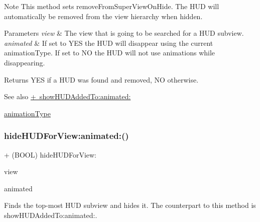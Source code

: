 \begin{DoxyNote}{Note}
This method sets {\ttfamily remove\+From\+Super\+View\+On\+Hide}. The H\+UD will automatically be removed from the view hierarchy when hidden.
\end{DoxyNote}

\begin{DoxyParams}{Parameters}
{\em view} & The view that is going to be searched for a H\+UD subview. \\
\hline
{\em animated} & If set to Y\+ES the H\+UD will disappear using the current animation\+Type. If set to NO the H\+UD will not use animations while disappearing. \\
\hline
\end{DoxyParams}
\begin{DoxyReturn}{Returns}
Y\+ES if a H\+UD was found and removed, NO otherwise.
\end{DoxyReturn}
\begin{DoxySeeAlso}{See also}
\mbox{\hyperlink{interface_m_b_progress_h_u_d_a2a981df80fbbb85db0d6c660d5882292}{+ show\+H\+U\+D\+Added\+To\+:animated\+:}} 

\mbox{\hyperlink{interface_m_b_progress_h_u_d_a71d04bb9e2839df9377ad10d03b2e468}{animation\+Type}} 
\end{DoxySeeAlso}
\mbox{\label{interface_m_b_progress_h_u_d_a7b0826c34eea1a15d62aabd00c249666}} 
\subsubsection{\texorpdfstring{hide\+H\+U\+D\+For\+View\+:animated\+:()}{hideHUDForView:animated:()}\hspace{0.1cm}{\footnotesize\ttfamily [3/3]}}
{\footnotesize\ttfamily + (B\+O\+OL) hide\+H\+U\+D\+For\+View\+: \begin{DoxyParamCaption}\item[{(U\+I\+View $\ast$)}]{view }\item[{animated:(B\+O\+OL)}]{animated }\end{DoxyParamCaption}}

Finds the top-\/most H\+UD subview and hides it. The counterpart to this method is show\+H\+U\+D\+Added\+To\+:animated\+:.

